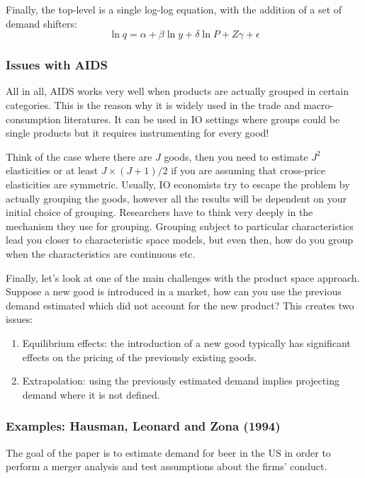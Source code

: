 Finally, the top-level is a single log-log equation, with the addition of a set of demand shifters: $$ \ln q = \alpha  + \beta \ln y + \delta \ln P + Z \gamma + \epsilon $$

\subsubsection{Issues with AIDS}

All in all, AIDS works very well when products are actually grouped in certain categories. This is the reason why it is widely used in the trade and macro-consumption literatures. It can be used in IO settings where groups could be single products but it requires instrumenting for every good!

Think of the case where there are $J$ goods, then you need to estimate $J^2$ elasticities or at least $J\times (J+1)/2$ if you are assuming that cross-price elasticities are symmetric. Usually, IO economists try to escape the problem by actually grouping the goods, however all the results will be dependent on your initial choice of grouping. Researchers have to think very deeply in the mechanism they use for grouping. Grouping subject to particular characteristics lead you closer to characteristic space models, but even then, how do you group when the characteristics are continuous etc.

Finally, let's look at one of the main challenges with the product space approach. Suppose a new good is introduced in a market, how can you use the previous demand estimated which did not account for the new product? This creates two issues:\begin{enumerate}
\item Equilibrium effects: the introduction of a new good typically has significant effects on the pricing of the previously existing goods.
\item Extrapolation: using the previously estimated demand implies projecting demand where it is not defined.
\end{enumerate}

\subsubsection{Examples: Hausman, Leonard and Zona (1994)}

The goal of the paper is to estimate demand for beer in the US in order to perform a merger analysis and test assumptions about the firms' conduct.

